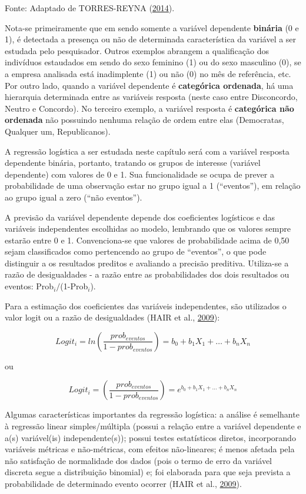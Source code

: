 \documentclass[12pt,brazil,oneside]{book}
\begin{document}
Fonte: Adaptado de TORRES-REYNA
(\protect\hyperlink{ref-Torres-Reyna2014}{2014}).

Nota-se primeiramente que em sendo somente a variável dependente
\textbf{binária} (0 e 1), é detectada a presença ou não de determinada
característica da variável a ser estudada pelo pesquisador. Outros
exemplos abrangem a qualificação dos indivíduos estaudados em sendo do
sexo feminino (1) ou do sexo masculino (0), se a empresa analisada está
inadimplente (1) ou não (0) no mês de referência, etc. Por outro lado,
quando a variável dependente é \textbf{categórica ordenada}, há uma
hierarquia determinada entre as variáveis resposta (neste caso entre
Disconcordo, Neutro e Concordo). No terceiro exemplo, a variável
resposta é \textbf{categórica não ordenada} não possuindo nenhuma
relação de ordem entre elas (Democratas, Qualquer um, Republicanos).

A regressão logística a ser estudada neste capítulo será com a variável
resposta dependente binária, portanto, tratando os grupos de interesse
(variável dependente) com valores de 0 e 1. Sua funcionalidade se ocupa
de prever a probabilidade de uma observação estar no grupo igual a 1
(``eventos''), em relação ao grupo igual a zero (``não eventos'').

A previsão da variável dependente depende dos coeficientes logísticos e
das variáveis independentes escolhidas ao modelo, lembrando que os
valores sempre estarão entre 0 e 1. Convenciona-se que valores de
probabilidade acima de 0,50 sejam classificados como pertencendo ao
grupo de ``eventos'', o que pode distinguir a os resultados preditos e
avaliando a precisão preditiva. Utiliza-se a razão de desigualdades - a
razão entre as probabilidades dos dois resultados ou eventos:
Prob\(_{i}/\)(1-Prob\(_{i}\)).

Para a estimação dos coeficientes das variáveis independentes, são
utilizados o valor logit ou a razão de desigualdades (HAIR et al.,
\protect\hyperlink{ref-Hair2009}{2009}):

\[
Logit_i=ln\left (\frac{prob_{eventos}}{1-prob_{eventos}}  \right )=b_0+b_1X_1+\ldots+b_nX_n
\]

ou

\[
Logit_i=\left (\frac{prob_{eventos}}{1-prob_{eventos}}  \right )=e^{b_0+b_1X_1+\ldots+b_nX_n}
\]

Algumas características importantes da regressão logística: a análise é
semelhante à regressão linear simples/múltipla (possui a relação entre a
variável dependente e a(s) variável(is) independente(s)); possui testes
estatísticos diretos, incorporando variáveis métricas e não-métricas,
com efeitos não-lineares; é menos afetada pela não satisfação de
normalidade dos dados (pois o termo de erro da variável discreta segue a
distribuição binomial) e; foi elaborada para que seja prevista a
probabilidade de determinado evento ocorrer (HAIR et al.,
\protect\hyperlink{ref-Hair2009}{2009}).
\end{document}
